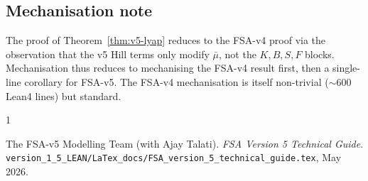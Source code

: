 \documentclass[11pt,a4paper]{article}
\theoremstyle{definition}
\begin{document}
\subsection{Mechanisation note}

The proof of Theorem~\ref{thm:v5-lyap} reduces to the FSA-v4 proof via the observation that the v5 Hill terms only modify $\bar\mu$, not the $K, B, S, F$ blocks. Mechanisation thus reduces to mechanising the FSA-v4 result first, then a single-line corollary for FSA-v5. The FSA-v4 mechanisation is itself non-trivial ($\sim 600$ Lean4 lines) but standard.

\bigskip

\begin{thebibliography}{1}

The FSA-v5 Modelling Team (with Ajay Talati). \emph{FSA Version 5 Technical Guide}. \texttt{version\_1\_5\_LEAN/LaTex\_docs/FSA\_version\_5\_technical\_guide.tex}, May 2026.

\end{thebibliography}
\end{document}
